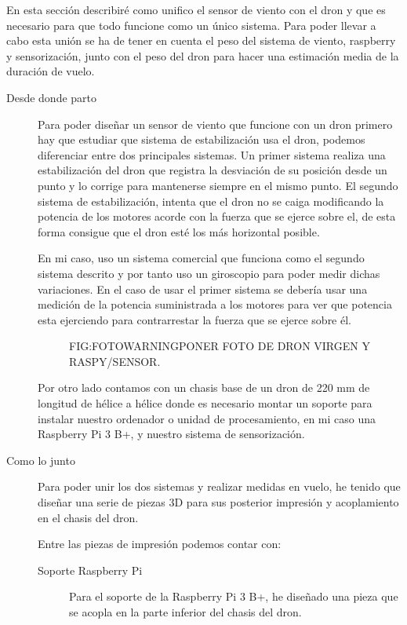 
En esta sección describiré como unifico el sensor de viento con el dron y que es necesario para que todo funcione como un único sistema.
Para poder llevar a cabo esta unión se ha de tener en cuenta el peso del sistema de viento, raspberry y sensorización, junto con el peso del dron para hacer una estimación media de la duración de vuelo.


\begin{description}
\item[Desde donde parto]
Para poder diseñar un sensor de viento que funcione con un dron primero hay que estudiar que sistema de estabilización usa el dron, podemos diferenciar entre dos principales sistemas. Un primer sistema realiza una estabilización del dron que registra la desviación de su posición desde un punto y lo corrige para mantenerse siempre en el mismo punto. El segundo sistema de estabilización, intenta que el dron no se caiga modificando la potencia de los motores acorde con la fuerza que se ejerce sobre el, de esta forma consigue que el dron esté los más horizontal posible.

En mi caso, uso un sistema comercial que funciona como el segundo sistema descrito y por tanto uso un giroscopio para poder medir dichas variaciones. En el caso de usar el primer sistema se debería usar una medición de la potencia suministrada a los motores para ver que potencia esta ejerciendo para contrarrestar la fuerza que se ejerce sobre él.

  \begin{figure}[Dron con y sin piezas añadidas]{FIG:FOTOWARNING}{PONER FOTO DE DRON VIRGEN Y RASPY/SENSOR.}
\end{figure}

Por otro lado contamos con un chasis base de un dron de 220 mm de longitud de hélice a hélice donde es necesario montar un soporte para instalar nuestro ordenador o unidad de procesamiento, en mi caso una Raspberry Pi 3 B+, y nuestro sistema de sensorización.

\item[Como lo junto]
Para poder unir los dos sistemas y realizar medidas en vuelo, he tenido que diseñar una serie de piezas 3D para sus posterior impresión y acoplamiento en el chasis del dron.

Entre las piezas de impresión podemos contar con:
\begin{description}
\item[Soporte Raspberry Pi]
Para el soporte de la Raspberry Pi 3 B+, he diseñado una pieza que se acopla en la parte inferior del chasis del dron. 


\end{description}
\end{description}
